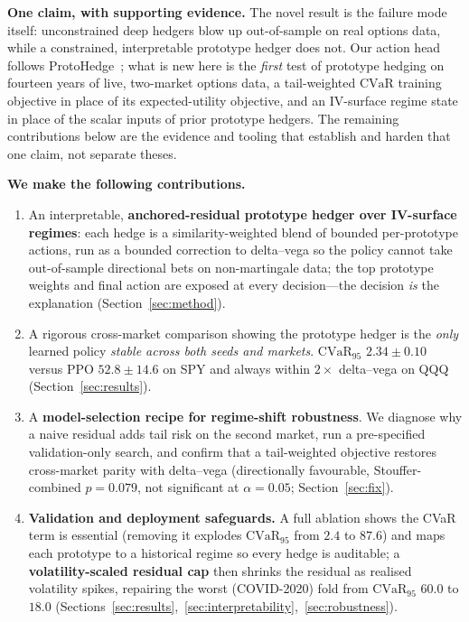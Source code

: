 \documentclass[sigconf,anonymous]{acmart}
\begin{document}
\noindent\textbf{One claim, with supporting evidence.} The novel result is the
failure mode itself: unconstrained deep hedgers blow up out-of-sample on real
options data, while a constrained, interpretable prototype hedger does not.
Our action head follows ProtoHedge~\cite{protohedge2025}; what is new here is the
\emph{first} test of prototype hedging on fourteen years of live, two-market
options data, a tail-weighted $\mathrm{CVaR}$ training objective in place of its
expected-utility objective, and an IV-surface regime state in place of the scalar
inputs of prior prototype hedgers. The remaining contributions below are the
evidence and tooling that establish and harden that one claim, not separate theses.

\noindent\textbf{We make the following contributions.}
\begin{enumerate}
\item An interpretable, \textbf{anchored-residual prototype hedger over IV-surface regimes}:
each hedge is a similarity-weighted blend of bounded per-prototype actions, run as a bounded
correction to delta--vega so the policy cannot take out-of-sample directional bets on
non-martingale data; the top prototype weights and final action are exposed at every
decision---the decision \emph{is} the explanation (Section~\ref{sec:method}).
\item A rigorous cross-market comparison showing the prototype hedger is the
\emph{only} learned policy \emph{stable across both seeds and markets}.
$\mathrm{CVaR}_{95}$ $2.34\!\pm\!0.10$ versus PPO $52.8\!\pm\!14.6$ on SPY
and always within $2\times$ delta--vega on QQQ (Section~\ref{sec:results}).
\item A \textbf{model-selection recipe for regime-shift robustness}. We diagnose
why a naive residual adds tail risk on the second market, run a pre-specified
validation-only search, and confirm that a tail-weighted objective restores
cross-market parity with delta--vega (directionally favourable, Stouffer-combined
$p=0.079$, not significant at $\alpha=0.05$; Section~\ref{sec:fix}).
\item \textbf{Validation and deployment safeguards.} A full ablation shows the CVaR
term is essential (removing it explodes $\mathrm{CVaR}_{95}$ from $2.4$ to $87.6$) and
maps each prototype to a historical regime so every hedge is auditable; a
\textbf{volatility-scaled residual cap} then shrinks the residual as realised volatility
spikes, repairing the worst (COVID-2020) fold from $\mathrm{CVaR}_{95}$ $60.0$ to $18.0$
(Sections~\ref{sec:results},~\ref{sec:interpretability},~\ref{sec:robustness}).
\end{enumerate}
\end{document}
